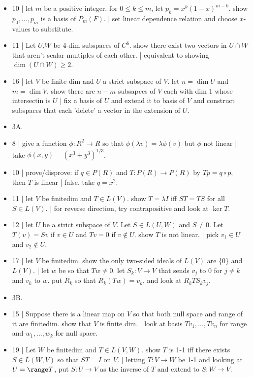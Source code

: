 \begin{itemize}
	\item 10 | let $m$ be a positive integer. for $0 \leq k \leq m$, let $p_k = x^k(1-x)^{m-k}$. show $p_0,\dots,p_m$ is a basis of $P_m(F)$. | set linear dependence relation and choose $x$-values to substitute. 
	\item 11 | Let $U$,$W$ be 4-dim subspaces of $C^6$. show there exist two vectors in $U \cap W$ that aren't scalar multiples of each other. | equivalent to showing $\dim (U \cap W) \geq 2$. 
	\item 16 | let $V$ be finite-dim and $U$ a strict subspace of $V$. let $n=\dim U$ and $m=\dim V$. show there are $n-m$ subsapces of $V$ each with dim 1 whose intersectin is $U$ | fix a basis of $U$ and extend it to basis of $V$ and construct subspaces that each 'delete' a vector in the extension of $U$. 
	\item 3A. 
	\item 8 | give a function $\phi: R^2 \to R$ so that $\phi(\lambda v) = \lambda \phi(v)$ but $\phi$ not linear | take $\phi(x,y) = (x^3 + y^3)^{1/3}$. 
	\item 10 | prove/disprove: if $q \in P(R)$ and $T: P(R) \to P(R)$ by $Tp = q \circ p$, then $T$ is linear | false. take $q =x^2$. 
	\item 11 | let $V$ be finitedim and $T \in L(V)$. show $T = \lambda I$ iff $ST=TS$ for all $S \in L(V)$. | for reverse direction, try contrapositive and look at $\ker T$. 
	\item 12 | let $U$ be a strict subspace of $V$. Let $S \in L(U,W)$ and $S \neq 0$. Let $T(v) = Sv$ if $v \in U$ and $Tv=0$ if $v \notin U$. show $T$ is not linear. | pick $v_1 \in U$ and $v_2 \notin U$. 
	\item 17 | let $V$ be finitedim. show the only two-sided ideals of $L(V)$ are $\{0\}$ and $L(V)$. | let $w$ be so that $Tw \neq 0$. let $S_k: V \to V$ that sends $v_j$ to 0 for $j \neq k$ and $v_k$ to $w$. put $R_k$ so that $R_k(Tw) = v_k$, and look at $R_kTS_kv_j$. 
	\item 3B. 
	\item 15 | Suppose there is a linear map on $V$ so that both null space and range of it are finitedim. show that $V$ is finite dim. | look at basis $Tv_1,\dots,Tv_n$ for range and $w_1,\dots,w_k$ for null space. 
	\item 19 | Let $W$ be finitedim and $T \in L(V,W)$. show $T$ is 1-1 iff there exists $S \in L(W,V)$ so that $ST=I$ on $V$. | letting $T: V \to W$ be 1-1 and looking at $U=\range T$, put $S: U \to V$ as the inverse of $T$ and extend to $S: W \to V$. 

\end{itemize}
